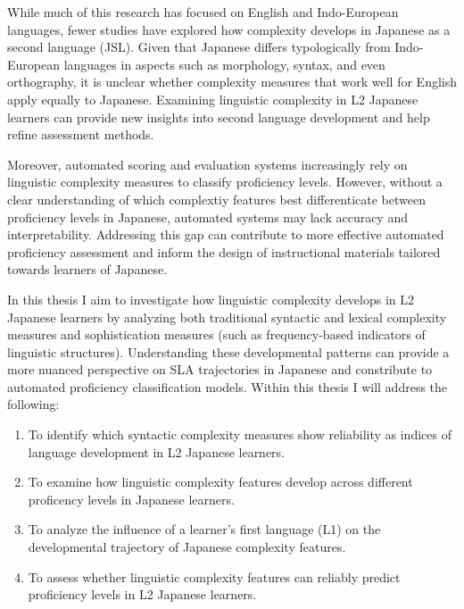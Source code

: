 While much of this research has focused on English and Indo-European languages, fewer studies have explored how
complexity develops in Japanese as a second language (JSL). Given that Japanese differs typologically from
Indo-European languages in aspects such as morphology, syntax, and even orthography, it is unclear whether
complexity measures that work well for English apply equally to Japanese. Examining linguistic complexity in L2
Japanese learners can provide new insights into second language development and help refine assessment methods.

Moreover, automated scoring and evaluation systems increasingly rely on linguistic complexity measures to classify
proficiency levels. However, without a clear understanding of which complextiy features best differenticate between
proficiency levels in Japanese, automated systems may lack accuracy and interpretability. Addressing this gap can
contribute to more effective automated proficiency assessment and inform the design of instructional materials
tailored towards learners of Japanese.

In this thesis I aim to  investigate how linguistic complexity develops in L2 Japanese learners by analyzing
both traditional syntactic and lexical complexity measures and sophistication measures (such as frequency-based
indicators of linguistic structures). Understanding these developmental patterns can provide a more nuanced
perspective on SLA trajectories in Japanese and constribute to automated proficiency classification models. Within
this thesis I will address the following:
\begin{enumerate}
    \item To identify which syntactic complexity measures show reliability as indices of language development in
    L2 Japanese learners.%
    \item To examine how linguistic complexity features develop across different proficency levels in Japanese
    learners.
    \item To analyze the influence of a learner's first language (L1) on the developmental trajectory of Japanese
    complexity features.
    \item To assess whether linguistic complexity features can reliably predict proficiency levels in L2 Japanese
    learners.
\end{enumerate}

